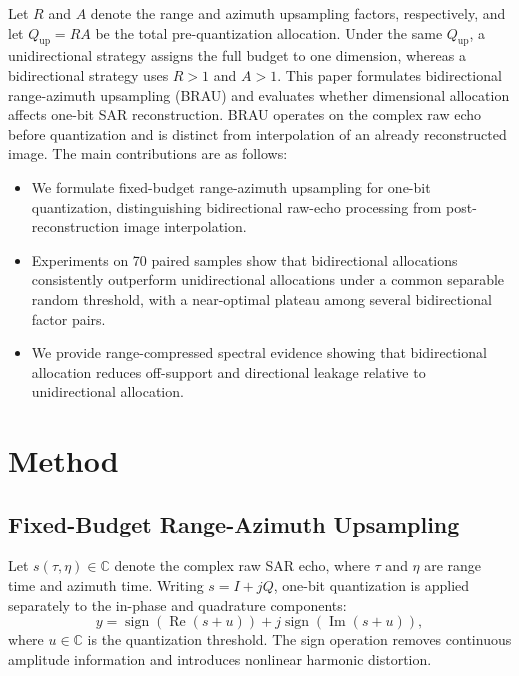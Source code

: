 \documentclass[conference]{IEEEtran}
\begin{document}
Let $R$ and $A$ denote the range and azimuth upsampling factors, respectively, and let $Q_{\mathrm{up}}=R A$ be the total pre-quantization allocation. Under the same $Q_{\mathrm{up}}$, a unidirectional strategy assigns the full budget to one dimension, whereas a bidirectional strategy uses $R>1$ and $A>1$. This paper formulates bidirectional range-azimuth upsampling (BRAU) and evaluates whether dimensional allocation affects one-bit SAR reconstruction. BRAU operates on the complex raw echo before quantization and is distinct from interpolation of an already reconstructed image. The main contributions are as follows:
\begin{itemize}
    \item We formulate fixed-budget range-azimuth upsampling for one-bit quantization, distinguishing bidirectional raw-echo processing from post-reconstruction image interpolation.
    \item Experiments on 70 paired samples show that bidirectional allocations consistently outperform unidirectional allocations under a common separable random threshold, with a near-optimal plateau among several bidirectional factor pairs.
    \item We provide range-compressed spectral evidence showing that bidirectional allocation reduces off-support and directional leakage relative to unidirectional allocation.
\end{itemize}

\section{Method}

\subsection{Fixed-Budget Range-Azimuth Upsampling}

Let $s(\tau,\eta)\in\mathbb{C}$ denote the complex raw SAR echo, where $\tau$ and $\eta$ are range time and azimuth time. Writing $s=I+jQ$, one-bit quantization is applied separately to the in-phase and quadrature components:
\begin{equation}
    y=\operatorname{sign}\!\left(\operatorname{Re}(s+u)\right)
    +j\operatorname{sign}\!\left(\operatorname{Im}(s+u)\right),
\end{equation}
where $u\in\mathbb{C}$ is the quantization threshold. The sign operation removes continuous amplitude information and introduces nonlinear harmonic distortion.
\end{document}
